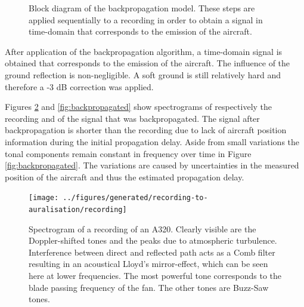 \begin{figure}[H]
  \centering
{}
  \caption{Block diagram of the backpropagation model. These steps are applied sequentially to a recording in order to obtain a signal in time-domain that corresponds to the emission of the aircraft.}
  \label{fig:backpropagation_block_diagram}
\end{figure}

After application of the backpropagation algorithm, a time-domain signal is
obtained that corresponds to the emission of the aircraft. The influence of the
ground reflection is non-negligible. A soft ground is still relatively
hard and therefore a -3 dB correction was applied.

Figures \ref{fig:recording} and \ref{fig:backpropagated} show spectrograms of
respectively the recording and of the signal that was backpropagated. The signal
after backpropagation is shorter than the recording due to lack of aircraft
position information during the initial propagation delay.
Aside from small variations the tonal components remain constant in frequency
over time in Figure \ref{fig:backpropagated}. The variations are caused
by uncertainties in the measured position of the aircraft and thus the estimated
propagation delay.


\begin{figure}[H]
  \centering
  \texttt{[image: ../figures/generated/recording-to-auralisation/recording]}
  \caption{
    Spectrogram of a recording of an A320. Clearly visible are the
    Doppler-shifted tones and the peaks due to atmospheric turbulence.
    Interference between direct and reflected path acts as a Comb filter resulting
    in an acoustical Lloyd's mirror-effect, which can be seen here at lower
    frequencies. The most powerful tone corresponds to the blade passing frequency
    of the fan. The other tones are Buzz-Saw tones.}
  \label{fig:recording}
\end{figure}

